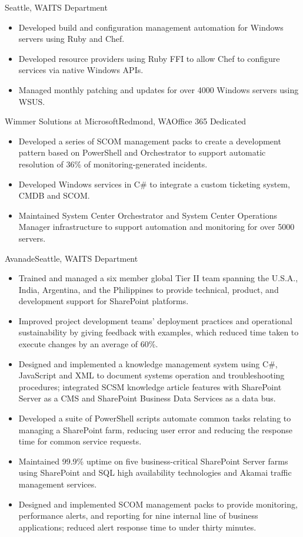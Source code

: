 \documentclass[11pt,letter,roman]{moderncv}
\begin{document}
{Seattle, WA}{ITS Department}{%
  \begin{itemize}
    \item Developed build and configuration management automation for Windows
      servers using Ruby and Chef.
    \item Developed resource providers using Ruby FFI to allow Chef to
      configure services via native Windows APIs.
    \item Managed monthly patching and updates for over 4000 Windows servers
      using WSUS.
  \end{itemize}
}
{Wimmer Solutions at Microsoft}{Redmond, WA}{Office 365 Dedicated}{%
  \begin{itemize}
    \item Developed a series of SCOM management packs to create a development
      pattern based on PowerShell and Orchestrator to support automatic
      resolution of 36\% of monitoring-generated incidents.
    \item Developed Windows services in C\# to integrate a custom ticketing
      system, CMDB and SCOM.
    \item Maintained System Center Orchestrator and System Center Operations
      Manager infrastructure to support automation and monitoring for over
      5000 servers.
  \end{itemize}
}
{Avanade}{Seattle, WA}{ITS Department}{%
  \begin{itemize}
    \item Trained and managed a six member global Tier II team spanning the
      U.S.A., India, Argentina, and the Philippines to provide technical,
      product, and development support for SharePoint platforms.
    \item Improved project development teams' deployment practices and
      operational sustainability by giving feedback with examples, which
      reduced time taken to execute changes by an average of 60\%.
    \item Designed and implemented a knowledge management system using C\#,
      JavaScript and XML to document systems operation and troubleshooting
      procedures; integrated SCSM knowledge article features with SharePoint
      Server as a CMS and SharePoint Business Data Services as a data bus.
    \item Developed a suite of PowerShell scripts automate common tasks
      relating to managing a SharePoint farm, reducing user error and reducing
      the response time for common service requests.
    \item Maintained 99.9\% uptime on five business-critical SharePoint
      Server farms using SharePoint and SQL high availability technologies and
      Akamai traffic management services.
    \item Designed and implemented SCOM management packs to provide
      monitoring, performance alerts, and reporting for nine internal line of
      business applications; reduced alert response time to
      under thirty minutes.
  \end{itemize}
}
\end{document}
